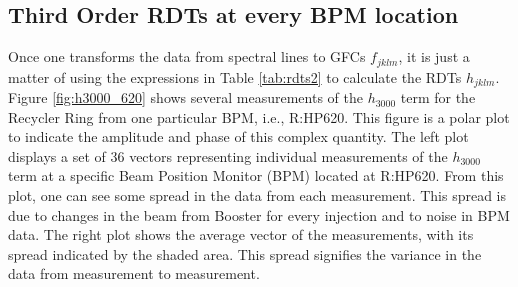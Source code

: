 
\subsection{Third Order RDTs at every BPM location}

Once one transforms the data from spectral lines to GFCs $f_{jklm}$, it is just a matter of using the expressions in Table \ref{tab:rdts2} to calculate the RDTs $h_{jklm}$. Figure \ref{fig:h3000_620} shows several measurements of the $h_{3000}$ term for the Recycler Ring from one particular BPM, i.e., R:HP620. This figure is a polar plot to indicate the amplitude and phase of this complex quantity. The left plot displays a set of 36 vectors representing individual measurements of the $h_{3000}$ term at a specific Beam Position Monitor (BPM) located at R:HP620. From this plot, one can see some spread in the data from each measurement. This spread is due to changes in the beam from Booster for every injection and to noise in BPM data. The right plot shows the average vector of the measurements, with its spread indicated by the shaded area. This spread signifies the variance in the data from measurement to measurement. 

